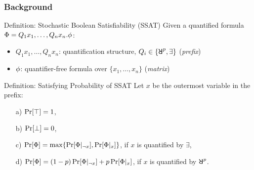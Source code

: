 \begin{frame}
      \frametitle{Background}
      \begin{block}{Definition: Stochastic Boolean Satisfiability (SSAT)}
            Given a quantified formula $\Phi=Q_1 x_1,\ldots,Q_n x_n.\phi$:
            \begin{itemize}
                  \item $Q_1 x_1,\ldots,Q_n x_n$: quantification structure, $Q_i \in \{\random{p},\exists\}$ (\emph{prefix})
                  \item $\phi$: quantifier-free formula over $\{x_1,\ldots,x_n\}$ (\emph{matrix})
            \end{itemize}
      \end{block}
      \pause
      \begin{block}{Definition: Satisfying Probability of SSAT}
            Let $x$ be the outermost variable in the prefix:
            \begin{enumerate}
                  \item[a)] $\Pr[\top]=1$,
                  \item[b)] $\Pr[\bot]=0$,
                  \item[c)] $\Pr[\Phi]=\max\{\Pr[\Phi|_{\lnot x}],\Pr[\Phi|_{x}]\}$, if $x$ is quantified by $\exists$,
                  \item[d)] $\Pr[\Phi]=(1-p)\Pr[\Phi|_{\lnot x}]+p\Pr[\Phi|_{x}]$, if $x$ is quantified by $\random{p}$.
            \end{enumerate}
      \end{block}
\end{frame}


